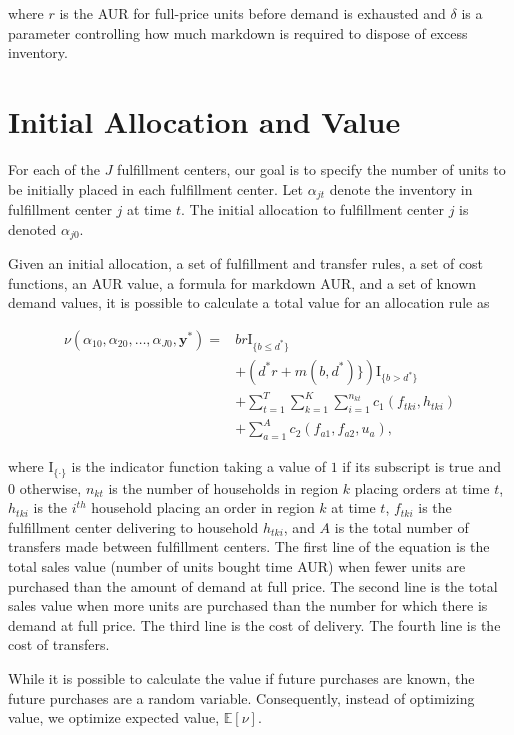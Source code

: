\documentclass[11pt, oneside]{article}   	%
\begin{document}
\noindent where $r$ is the AUR for full-price units before demand is exhausted and $\delta$ is a parameter controlling how much markdown is required to dispose of excess inventory.

\section{Initial Allocation and Value}

For each of the $J$ fulfillment centers, our goal is to specify the number of units to be initially placed in each fulfillment center.  Let $\alpha_{jt}$ denote the inventory in fulfillment center $j$ at time $t$.  The initial allocation to fulfillment center $j$ is denoted $\alpha_{j0}$.

Given an initial allocation, a set of fulfillment and transfer rules, a set of cost functions, an AUR value, a formula for markdown AUR, and a set of known demand values, it is possible to calculate a total value for an allocation rule as

\begin{align*}
\nu(\alpha_{10}, \alpha_{20}, \ldots, \alpha_{J0}, \mathbf{y}^*) = &br \mathrm{I}_{\{b \leq d^*\}} \\
&+ \left( d^*r + m(b, d^*) \} \right) \mathrm{I}_{ \{ b > d^* \} } \\
&+ \sum_{t = 1}^T \sum_{k = 1}^K \sum_{i = 1}^{n_{kt}} c_1 (f_{tki}, h_{tki}) \\
&+ \sum_{a = 1}^A c_2 (f_{a1}, f_{a2}, u_a),
\end{align*}

\noindent where $\mathrm{I}_{\{ \cdot \}}$ is the indicator function taking a value of $1$ if its subscript is true and $0$ otherwise, $n_{kt}$ is the number of households in region $k$ placing orders at time $t$, $h_{tki}$ is the $i^{th}$ household placing an order in region $k$ at time $t$, $f_{tki}$ is the fulfillment center delivering to household $h_{tki}$, and $A$ is the total number of transfers made between fulfillment centers.  The first line of the equation is the total sales value (number of units bought time AUR) when fewer units are purchased than the amount of demand at full price.  The second line is the total sales value when more units are purchased than the number for which there is demand at full price.  The third line is the cost of delivery.  The fourth line is the cost of transfers.

While it is possible to calculate the value if future purchases are known, the future purchases are a random variable.  Consequently, instead of optimizing value, we optimize expected value, $\mathbb{E}[\nu]$.
\end{document}
